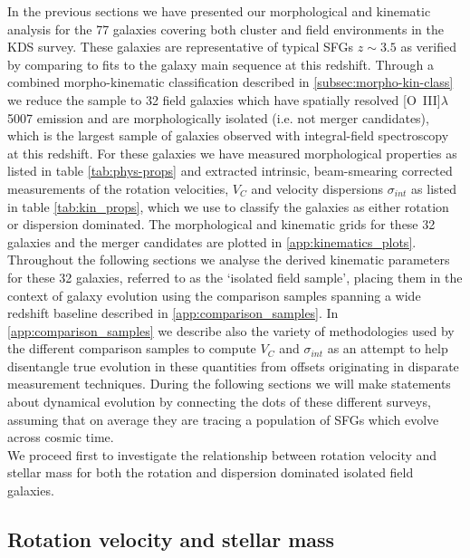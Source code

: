 \documentclass[fleqn,usenatbib]{mn2e}
\begin{document}
In the previous sections we have presented our morphological and kinematic analysis for the 77 galaxies covering both cluster and field environments in the KDS survey.
These galaxies are representative of typical SFGs $z\sim3.5$ as verified by comparing to fits to the galaxy main sequence at this redshift.
Through a combined morpho-kinematic classification described in \cref{subsec:morpho-kin-class} we reduce the sample to 32 field galaxies which have spatially resolved [O~{\sc III}]$\lambda$5007 emission and are morphologically isolated (i.e. not merger candidates), which is the largest sample of galaxies observed with integral-field spectroscopy at this redshift.
For these galaxies we have measured morphological properties as listed in table \ref{tab:phys-props} and extracted intrinsic, beam-smearing corrected measurements of the rotation velocities, $V_{C}$ and velocity dispersions $\sigma_{int}$ as listed in table \ref{tab:kin_props}, which we use to classify the galaxies as either rotation or dispersion dominated.
The morphological and kinematic grids for these 32 galaxies and the merger candidates are plotted in \cref{app:kinematics_plots}. \\

Throughout the following sections we analyse the derived kinematic parameters for these 32 galaxies, referred to as the `isolated field sample', placing them in the context of galaxy evolution using the comparison samples spanning a wide redshift baseline described in \cref{app:comparison_samples}.
In \cref{app:comparison_samples} we describe also the variety of methodologies used by the different comparison samples to compute $V_{C}$ and $\sigma_{int}$ as an attempt to help disentangle true evolution in these quantities from offsets originating in disparate measurement techniques.
During the following sections we will make statements about dynamical evolution by connecting the dots of these different surveys, assuming that on average they are tracing a population of SFGs which evolve across cosmic time.  \\

We proceed first to investigate the relationship between rotation velocity and stellar mass for both the rotation and dispersion dominated isolated field galaxies.

\subsection{Rotation velocity and stellar mass}\label{subsec:results_rotation_vel}
\end{document}
